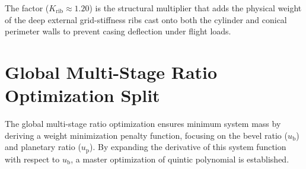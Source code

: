         The factor ($K_{\text{rib}} \approx 1.20$) is the structural multiplier that adds the 
        physical weight of the deep external grid-stiffness ribs cast onto both the cylinder and 
        conical perimeter walls to prevent casing deflection under flight loads.

\section{Global Multi-Stage Ratio Optimization Split}
    The global multi-stage ratio optimization ensures minimum system mass by deriving a 
    weight minimization penalty function, focusing on the bevel ratio ($u_{\text{b}}$) and planetary ratio ($u_{\text{p}}$). 
    By expanding the derivative of this system function with respect to $u_{\text{b}}$, a master optimization of 
    quintic polynomial is established.

